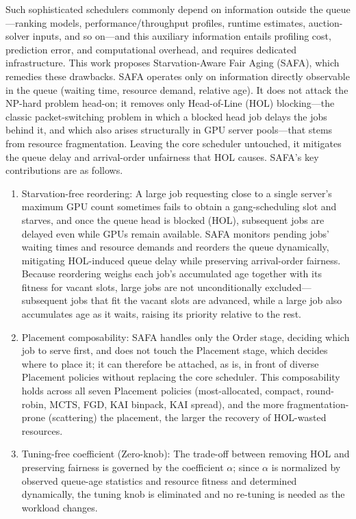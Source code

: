 \documentclass{ieeetj}
\begin{document}
Such sophisticated schedulers commonly depend on information outside the queue---ranking models, performance/throughput profiles, runtime estimates, auction-solver inputs, and so on---and this auxiliary information entails profiling cost, prediction error, and computational overhead, and requires dedicated infrastructure. This work proposes Starvation-Aware Fair Aging (SAFA), which remedies these drawbacks. SAFA operates only on information directly observable in the queue (waiting time, resource demand, relative age). It does not attack the NP-hard problem head-on; it removes only Head-of-Line (HOL) blocking\cite{karol1987hol}---the classic packet-switching problem in which a blocked head job delays the jobs behind it, and which also arises structurally in GPU server pools---that stems from resource fragmentation. Leaving the core scheduler untouched, it mitigates the queue delay and arrival-order unfairness that HOL causes. SAFA's key contributions are as follows.
\begin{enumerate}
\item Starvation-free reordering: A large job requesting close to a single server's maximum GPU count sometimes fails to obtain a gang-scheduling slot and starves, and once the queue head is blocked (HOL), subsequent jobs are delayed even while GPUs remain available. SAFA monitors pending jobs' waiting times and resource demands and reorders the queue dynamically, mitigating HOL-induced queue delay while preserving arrival-order fairness. Because reordering weighs each job's accumulated age together with its fitness for vacant slots, large jobs are not unconditionally excluded---subsequent jobs that fit the vacant slots are advanced, while a large job also accumulates age as it waits, raising its priority relative to the rest.
\item Placement composability: SAFA handles only the Order stage, deciding which job to serve first, and does not touch the Placement stage, which decides where to place it; it can therefore be attached, as is, in front of diverse Placement policies without replacing the core scheduler. This composability holds across all seven Placement policies (most-allocated, compact, round-robin, MCTS, FGD, KAI binpack, KAI spread), and the more fragmentation-prone (scattering) the placement, the larger the recovery of HOL-wasted resources.
\item Tuning-free coefficient (Zero-knob): The trade-off between removing HOL and preserving fairness is governed by the coefficient $\alpha$; since $\alpha$ is normalized by observed queue-age statistics and resource fitness and determined dynamically, the tuning knob is eliminated and no re-tuning is needed as the workload changes.

\end{enumerate}
\end{document}

